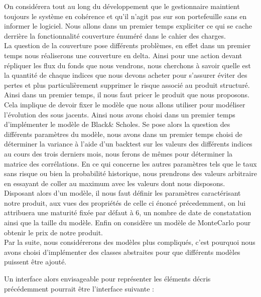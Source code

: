 \documentclass[french,12pt,a4paper]{article}
\begin{document}
On considérera tout au long du développement que le gestionnaire maintient toujours le système en cohérence et qu'il n'agit pas sur son portefeuille sans en informer le logiciel.
Nous allons dans un premier temps expliciter ce qui se cache derrière la fonctionnalité couverture énuméré dans le cahier des charges.\\
La question de la couverture pose différents problèmes, en effet dans un premier temps nous réaliserons une couverture en delta. Ainsi pour une action devant répliquer les flux du fonds que nous vendrons, nous cherchons à savoir quelle est la quantité de chaque indices que nous devons acheter pour s'assurer éviter des pertes et plus particulièrement supprimer le risque associé au produit structuré.\\
Ainsi dans un premier temps, il nous faut pricer le produit que nous proposons. Cela implique  de devoir fixer le modèle que nous allons utiliser pour modéliser l'évolution des sous jacents. Ainsi nous avons choisi dans un premier temps d'implémenter le modèle de Black\& Scholes. Se pose alors la question des différents paramètres du modèle, nous avons dans un premier temps choisi de déterminer la variance à l'aide d'un backtest sur les valeurs des différents indices au cours des trois derniers mois, nous ferons de mêmes pour déterminer la matrice des corrélations. En ce qui concerne les autres paramètres tels que le taux sans risque ou bien la probabilité historique, nous prendrons des valeurs arbitraire en essayant de coller au maximum avec les valeurs dont nous disposons.\\
Disposant alors d'un modèle, il nous faut définir les paramètres caractérisant notre produit, aux vues des propriétés de celle ci énoncé précedemment, on lui attribuera une maturité fixée par défaut à 6, un nombre de date de constatation ainsi que la taille du modèle.
Enfin on considère un modèle de MonteCarlo pour obtenir le prix de notre produit.\\
Par la suite, nous considérerons des modèles plus compliqués, c'est pourquoi nous avons choisi d'implémenter des classes abstraites pour que différents modèles puissent être ajouté.
 
 Un interface alors envisageable pour représenter les éléments décris précédemment pourrait être l'interface suivante :\\
 
\end{document}
